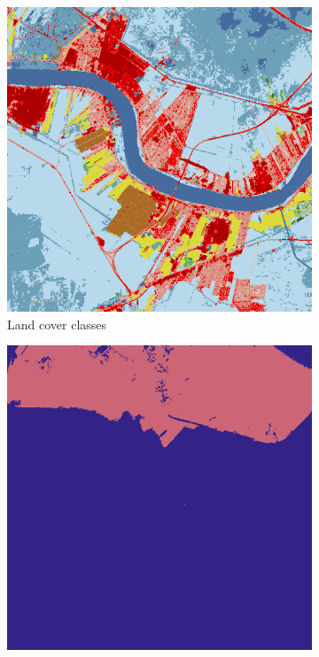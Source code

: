 \documentclass[journal,compsoc]{IEEEtran}
\begin{document}
\begin{figure}[t!]
	\centering
	\begin{subfigure}[b]{0.4\textwidth}
		\centering
		\includegraphics[width=\textwidth]{landcover}
		\caption{Land cover classes}
		\label{base}
	\end{subfigure}
	\hfill
	\begin{subfigure}[b]{0.4\textwidth}
		\centering
		\includegraphics[width=\textwidth]{2clusters}

\end{subfigure}
\end{figure}
\end{document}
